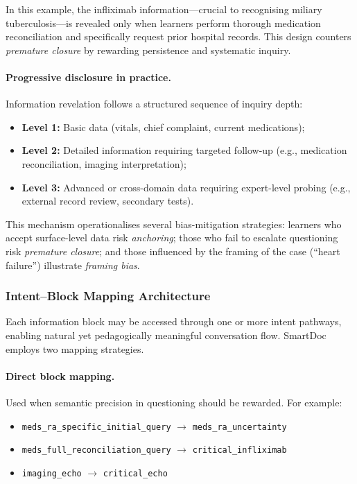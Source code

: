 In this example, the infliximab information—crucial to recognising miliary
tuberculosis—is revealed only when learners perform thorough medication reconciliation
and specifically request prior hospital records.  
This design counters \textit{premature closure} by rewarding persistence and systematic
inquiry.

\paragraph{Progressive disclosure in practice.}
Information revelation follows a structured sequence of inquiry depth:

\begin{itemize}
  \item \textbf{Level 1:} Basic data (vitals, chief complaint, current medications);
  \item \textbf{Level 2:} Detailed information requiring targeted follow-up
  (e.g., medication reconciliation, imaging interpretation);
  \item \textbf{Level 3:} Advanced or cross-domain data requiring expert-level probing
  (e.g., external record review, secondary tests).
\end{itemize}

This mechanism operationalises several bias-mitigation strategies:
learners who accept surface-level data risk \textit{anchoring};
those who fail to escalate questioning risk \textit{premature closure};
and those influenced by the framing of the case (``heart failure'')
illustrate \textit{framing bias}.

\subsubsection{Intent–Block Mapping Architecture}

Each information block may be accessed through one or more intent pathways,
enabling natural yet pedagogically meaningful conversation flow.
SmartDoc employs two mapping strategies.

\paragraph{Direct block mapping.}
Used when semantic precision in questioning should be rewarded.
For example:

\begin{itemize}
  \item \texttt{meds\_ra\_specific\_initial\_query} $\rightarrow$ \texttt{meds\_ra\_uncertainty}
  \item \texttt{meds\_full\_reconciliation\_query} $\rightarrow$ \texttt{critical\_infliximab}
  \item \texttt{imaging\_echo} $\rightarrow$ \texttt{critical\_echo}
\end{itemize}

